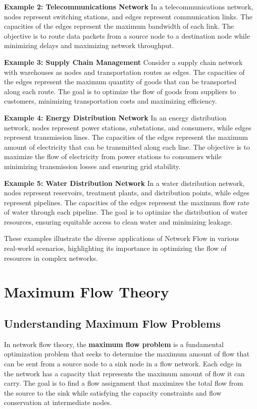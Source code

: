 \documentclass[12pt]{book} %
\begin{document}
\textbf{Example 2: Telecommunications Network}
In a telecommunications network, nodes represent switching stations, and edges represent communication links. The capacities of the edges represent the maximum bandwidth of each link. The objective is to route data packets from a source node to a destination node while minimizing delays and maximizing network throughput.

\textbf{Example 3: Supply Chain Management}
Consider a supply chain network with warehouses as nodes and transportation routes as edges. The capacities of the edges represent the maximum quantity of goods that can be transported along each route. The goal is to optimize the flow of goods from suppliers to customers, minimizing transportation costs and maximizing efficiency.

\textbf{Example 4: Energy Distribution Network}
In an energy distribution network, nodes represent power stations, substations, and consumers, while edges represent transmission lines. The capacities of the edges represent the maximum amount of electricity that can be transmitted along each line. The objective is to maximize the flow of electricity from power stations to consumers while minimizing transmission losses and ensuring grid stability.

\textbf{Example 5: Water Distribution Network}
In a water distribution network, nodes represent reservoirs, treatment plants, and distribution points, while edges represent pipelines. The capacities of the edges represent the maximum flow rate of water through each pipeline. The goal is to optimize the distribution of water resources, ensuring equitable access to clean water and minimizing leakage.

These examples illustrate the diverse applications of Network Flow in various real-world scenarios, highlighting its importance in optimizing the flow of resources in complex networks.


\section{Maximum Flow Theory}

\subsection{Understanding Maximum Flow Problems}
In network flow theory, the \textbf{maximum flow problem} is a fundamental optimization problem that seeks to determine the maximum amount of flow that can be sent from a source node to a sink node in a flow network. Each edge in the network has a capacity that represents the maximum amount of flow it can carry. The goal is to find a flow assignment that maximizes the total flow from the source to the sink while satisfying the capacity constraints and flow conservation at intermediate nodes.
\end{document}
